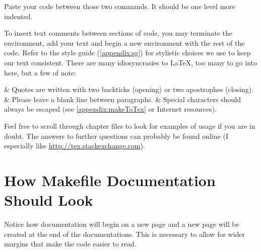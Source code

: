 Paste your code between those two commands. It should be one level more indented.

To insert text comments between sections of code, you may terminate the environment, add your text and begin a new environment with the rest of the code. Refer to the style guide (\autoref{appendix:sg}) for stylistic choices we use to keep our text consistent. There are many idiosyncrasies to \LaTeX, too many to go into here, but a few of note:

\begin{easylist}[itemize]
	& Quotes are written with two backticks (opening) or two apostrophes (closing).
	& Please leave a blank line between paragraphs. 
	& Special characters should always be escaped (see \autoref{appendix:makeToTex} or Internet resources).
\end{easylist}

Feel free to scroll through chapter files to look for examples of usage if you are in doubt. The answers to further questions can probably be found online (I especially like \url{http://tex.stackexchange.com}).

\section{How Makefile Documentation Should Look}

Notice how documentation will begin on a new page and a new page will be created at the end of the documentations. This is necessary to allow for wider margins that make the code easier to read.

